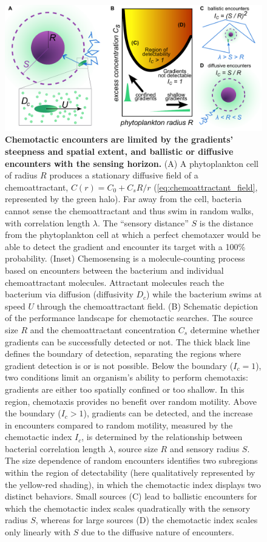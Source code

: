 \documentclass[9pt,twocolumn,twoside]{pnas-new}
\begin{document}
\begin{figure}
    \centering
    \includegraphics[width=17.8cm]{fig2_new.pdf}
    \caption{
        \textbf{
        Chemotactic encounters are limited by the gradients' steepness and spatial extent, and ballistic or diffusive encounters with the sensing horizon.
        }
        (A) A phytoplankton cell of radius $R$ produces a stationary diffusive field of a chemoattractant, $C(r) = C_0 + C_s R/r$ (\autoref{eq:chemoattractant_field}, represented by the green halo).
        Far away from the cell, bacteria cannot sense the chemoattractant and thus swim in random walks, with correlation length $\lambda$.
        The ``sensory distance'' $S$ is the distance from the phytoplankton cell at which a perfect chemotaxer would be able to detect the gradient and encounter its target with a 100\% probability.
        (Inset) Chemosensing is a molecule-counting process based on encounters between the bacterium and individual chemoattractant molecules.
        Attractant molecules reach the bacterium via diffusion (diffusivity $D_c$) while the bacterium swims at speed $U$ through the chemoattractant field.
        (B) Schematic depiction of the performance landscape for chemotactic searches.
        The source size $R$ and the chemoattractant concentration $C_s$ determine whether gradients can be successfully detected or not.
        The thick black line defines the boundary of detection, separating the regions where gradient detection is or is not possible.
        Below the boundary ($I_c=1$), two conditions limit an organism's ability to perform chemotaxis: gradients are either too spatially confined or too shallow. In this region, chemotaxis provides no benefit over random motility.
        Above the boundary ($I_c>1$), gradients can be detected, and the increase in encounters compared to random motility, measured by the chemotactic index $I_c$, is determined by the relationship between bacterial correlation length $\lambda$, source size $R$ and sensory radius $S$.
        The size dependence of random encounters identifies two subregions within the region of detectability (here qualitatively represented by the yellow-red shading), in which the chemotactic index displays two distinct behaviors.
        Small sources (C) lead to ballistic encounters for which the chemotactic index scales quadratically with the sensory radius $S$, whereas for large sources (D) the chemotactic index scales only linearly with $S$ due to the diffusive nature of encounters.
    }
    \label{fig:sensing}
\end{figure}
\end{document}
